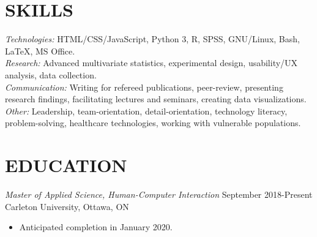 \documentclass[10pt]{res} %
\begin{document}
\begin{resume}

 



\section{SKILLS} 

{\sl Technologies:} HTML/CSS/JavaScript, Python 3, R, SPSS, GNU/Linux, Bash, \LaTeX, MS Office. 
\vspace{2mm}\\
{\sl Research:} Advanced multivariate statistics, experimental design, usability/UX analysis, data collection. 
\vspace{2mm}\\
{\sl Communication:} Writing for refereed publications, peer-review, presenting research findings, facilitating lectures and seminars, creating data visualizations. 
\vspace{2mm}\\
{\sl Other:} Leadership, team-orientation, detail-orientation, technology literacy, problem-solving, healthcare technologies, working with vulnerable populations.


\section{EDUCATION}
{\sl Master of Applied Science, Human-Computer Interaction} \hfill September 2018-Present\newline
Carleton University, Ottawa, ON
\begin{itemize}
    \item Anticipated completion in January 2020.
\end{itemize}{}


\end{resume}
\end{document}
